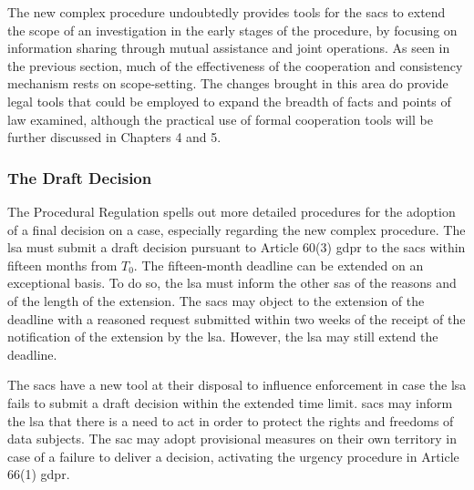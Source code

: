 The new complex procedure undoubtedly provides tools for the \glspl{sac} to extend the scope of an investigation in the early stages of the procedure, by focusing on information sharing through mutual assistance and joint operations. 
As seen in the previous section, much of the effectiveness of the cooperation and consistency mechanism rests on scope-setting.
The changes brought in this area do provide legal tools that could be employed to expand the breadth of facts and points of law examined, although the practical use of formal cooperation tools will be further discussed in Chapters 4 and 5.

\subsubsection{The Draft Decision}
\label{sec:ch3-draft-decision}

The Procedural Regulation spells out more detailed procedures for the adoption of a final decision on a case, especially regarding the new complex procedure.
The \gls{lsa} must submit a draft decision pursuant to Article 60(3) \gls{gdpr} to the \glspl{sac} within fifteen months from $T_0$.\autocite[12(1)]{ProceduralRegulation}
The fifteen-month deadline can be extended on an exceptional basis.\autocite[12(3)]{ProceduralRegulation}
To do so, the \gls{lsa} must inform the other \glspl{sa} of the reasons and of the length of the extension.\autocite[12(3)]{ProceduralRegulation}
The \glspl{sac} may object to the extension of the deadline with a reasoned request submitted within two weeks of the receipt of the notification of the extension by the \gls{lsa}.\autocite[12(4)]{ProceduralRegulation}
However, the \gls{lsa} may still extend the deadline.\autocite[12(5)]{ProceduralRegulation}

The \glspl{sac} have a new tool at their disposal to influence enforcement in case the \gls{lsa} fails to submit a draft decision within the extended time limit.
\glspl{sac} may inform the \gls{lsa} that there is a need to act in order to protect the rights and freedoms of data subjects.\autocite[12(5)]{ProceduralRegulation}
The \gls{sac} may adopt provisional measures on their own territory in case of a failure to deliver a decision, activating the urgency procedure in Article 66(1) \gls{gdpr}.\autocite[12(5)]{ProceduralRegulation}

